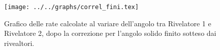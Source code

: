 \begin{figure}[h] \centering\texttt{[image: ../../graphs/correl\_fini.tex]}\caption{Grafico delle rate calcolate al variare dell'angolo tra Rivelatore 1 e Rivelatore 2, dopo la correzione per l'angolo solido finito sotteso dai rivealtori.}\label{gr:correl_fini} \end{figure}
